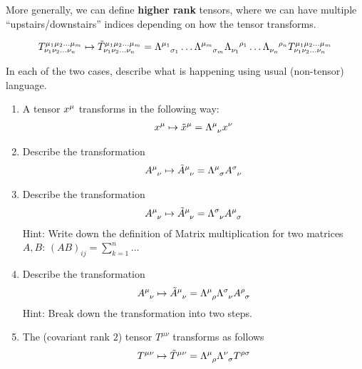 More generally, we can define \textbf{higher rank} tensors, where we can have multiple ``upstairs/downstairs'' indices depending on how the tensor transforms.

\begin{align*}
  T_{\nu_1 \nu_2 \ldots \nu_n}^{\mu_1 \mu_2 \ldots \mu_m} \mapsto 
  \tilde{T}_{\nu_1 \nu_2 \ldots \nu_n}^{\mu_1 \mu_2 \ldots \mu_m} 
  =
  \tensor{\Lambda}{^{\mu_1}_{\sigma_1}} \ldots \tensor{\Lambda}{^{\mu_m}_{\sigma_m}}
  \tensor{\Lambda}{_{\nu_1}^{\rho_1}}
  \ldots
  \tensor{\Lambda}{_{\nu_n}^{\rho_n}}
  T_{\nu_1 \nu_2 \ldots \nu_n}^{\mu_1 \mu_2 \ldots \mu_m} 
\end{align*}


\begin{ex}[]
  In each of the two cases, describe what is happening using usual (non-tensor) language.
  \begin{enumerate}
    \item A tensor $\tensor{x}{^\mu}$ transforms in the following way:
      \begin{align*}
        x^{\mu} \mapsto \tilde{x}^{\mu} = \tensor{\Lambda}{^\mu_\nu}x^{\nu}
      \end{align*}
    \item Describe the transformation
      \begin{align*}
        \tensor{A}{^\mu_\nu} \mapsto \tensor{\tilde{A}}{^{\mu}_\nu} = \tensor{\Lambda}{^{\mu}_\sigma}\tensor{A}{^{\sigma}_{\nu}}
      \end{align*}
    \item Describe the transformation
      \begin{align*}
        \tensor{A}{^\mu_\nu} \mapsto \tensor{\tilde{A}}{^{\mu}_\nu} = \tensor{\Lambda}{^{\sigma}_\nu}\tensor{A}{^{\mu}_\sigma}
      \end{align*}
      Hint: Write down the definition of Matrix multiplication for two matrices $A,B$: $(AB)_{ij} = \sum_{k=1}^{n}\ldots$
    \item Describe the transformation
      \begin{align*}
        \tensor{A}{^\mu_\nu} \mapsto \tensor{\tilde{A}}{^\mu_\nu} = \tensor{\Lambda}{^{\mu}_{\rho}} \tensor{\Lambda}{^{\sigma}_{\nu}}\tensor{A}{^\rho_{\sigma}}
      \end{align*}
      Hint: Break down the transformation into two steps.
    \item The (covariant rank $2$) tensor $T^{\mu \nu}$ transforms as follows
      \begin{align*}
        T^{\mu \nu} \mapsto \tilde{T}^{\mu \nu} = \tensor{\Lambda}{^{\mu}_{\rho}}\tensor{\Lambda}{^{\nu}_{\sigma}}T^{\rho \sigma}

\end{align*}
\end{enumerate}
\end{ex}
